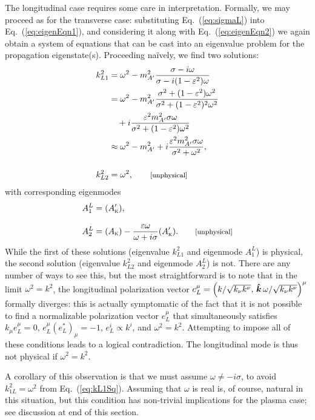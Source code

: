 \documentclass[amsmath,amssymb,aps,10pt,prd,letterpaper,nofootinbib,balancelastpage,notitlepage,superscriptaddress,twocolumn,floatfix]{revtex4-2}
\renewcommand{\eqref}[2][]{Eq{#1}.~(\ref{eq:#2})}	%
\newcommand{\lb}{\ensuremath{\left}}					%
\newcommand{\rb}{\ensuremath{\right}}					%
\newcommand{\nl}{\nonumber \\ & \quad }					%
\newcommand{\kin}[1]{({#1}_{\textsc{k}})}
\newcommand{\primekin}[1]{({#1}_{\textsc{k}}^\prime)}
\begin{document}
The longitudinal case requires some care in interpretation.
Formally, we may proceed as for the transverse case: substituting \eqref{sigmaL} into \eqref{eigenEqn1}, and considering it along with \eqref{eigenEqn2} we again obtain a system of equations that can be cast into an eigenvalue problem for the propagation eigenstate(s).
Proceeding na\"ively, we find two solutions:
\begin{align}
    k_{L1}^2 &= \omega^2 - m_{A'}^2 \frac{\sigma - i \omega}{\sigma - i (1-\varepsilon^2) \omega}\label{eq:kL1Sq} \\
    &= \omega^2 - m_{A'}^2 \frac{\sigma^2 + (1-\varepsilon^2) \omega^2}{\sigma^2 + (1-\varepsilon^2)^2\omega^2} \nl
    + i \frac{ \varepsilon^2 m_{A'}^2\sigma\omega }{ \sigma^2 + (1-\varepsilon^2) \omega^2 }\\
    &\approx \omega^2 - m_{A'}^2 + i \frac{ \varepsilon^2 m_{A'}^2\sigma\omega }{ \sigma^2 + \omega^2 } ,\\[3ex]
    k_{L2}^2 &= \omega^2,\qquad \text{\footnotesize[unphysical]}
\end{align} 
with corresponding eigenmodes
\begin{align}
    A_{1}^{L} &= \primekin{A}, \label{eq:A1L}\\[2ex]
    A_{2}^{L} &= \kin{A} - \frac{\varepsilon\omega}{\omega+i\sigma}\primekin{A}. \qquad \text{\footnotesize[unphysical]}\label{eq:A2L}
\end{align} 
While the first of these solutions (eigenvalue $k_{L1}^2$ and eigenmode $A_{1}^{L}$) is physical, the second solution (eigenvalue $k_{L2}^2$ and eigenmode $A_{2}^{L}$) is not.
There are any number of ways to see this, but the most straightforward is to note that in the limit $\omega^2 = k^2$, the longitudinal polarization vector $e^\mu_L = \lb( k/\sqrt{ k_\nu k^\nu }  , \,\bm{\hat{k}}\, \omega /\sqrt{ k_\nu k^\nu }  \rb)^\mu$ formally diverges: this is actually symptomatic of the fact that it is not possible to find a normalizable polarization vector $e_L^\mu$ that simultaneously satisfies $k_\mu e_L^\mu = 0$, $e_{L}^\mu (e^*_{L})_\mu = -1$, $e_L^i \propto k^i$, and $\omega^2 = k^2$. 
Attempting to impose all of these conditions leads to a logical contradiction.
The longitudinal mode is thus not physical if $\omega^2 = k^2$.

A corollary of this observation is that we must assume $\omega \neq -i\sigma$, to avoid $k_{1L}^2=\omega^2$ from \eqref{kL1Sq}.
Assuming that $\omega$ is real is, of course, natural in this situation, but this condition has non-trivial implications for the plasma case; see discussion at end of this section.
\end{document}
